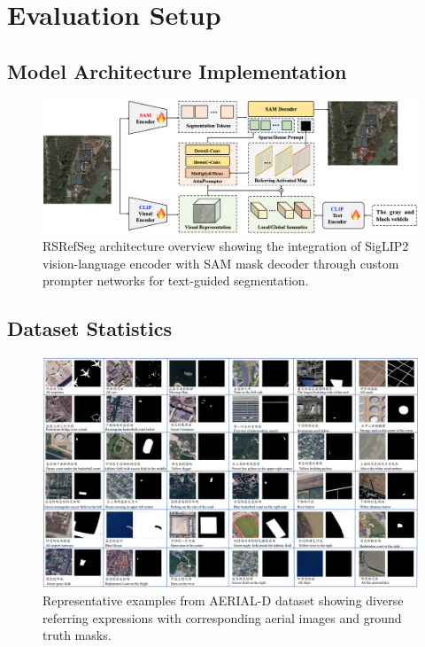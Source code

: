 \section{Evaluation Setup}

\subsection{Model Architecture Implementation}

\begin{figure}[H]
\centering
\includegraphics[width=\textwidth]{RSRefSeg.png}
\caption{RSRefSeg architecture overview showing the integration of SigLIP2 vision-language encoder with SAM mask decoder through custom prompter networks for text-guided segmentation.}
\label{fig:rsrefseg_architecture}
\end{figure}

\subsection{Dataset Statistics}

\begin{figure}[H]
\centering
\includegraphics[width=\textwidth]{dataset.png}
\caption{Representative examples from AERIAL-D dataset showing diverse referring expressions with corresponding aerial images and ground truth masks.}
\label{fig:dataset_examples}
\end{figure}

